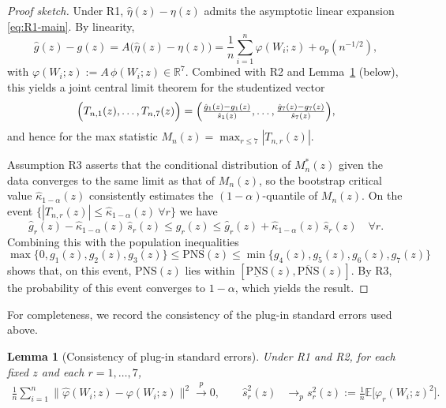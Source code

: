 \documentclass[accepted]{uai2026} %
\theoremstyle{plain}
\newtheorem{lemma}[theorem]{Lemma}
\theoremstyle{definition}
\theoremstyle{remark}
\begin{document}
\begin{proof}[Proof sketch]
Under R1, $\hat\eta(z) - \eta(z)$ admits the asymptotic linear expansion
\eqref{eq:R1-main}. By linearity,
\[
  \hat g(z) - g(z)
  = A\bigl(\hat\eta(z) - \eta(z)\bigr)
  = \frac{1}{n}\sum_{i=1}^n \varphi(W_i;z) + o_p(n^{-1/2}),
\]
with $\varphi(W_i;z) := A\,\phi(W_i;z) \in \mathbb{R}^7$. Combined with R2 and
Lemma~\ref{lem:SE-consistency} (below), this yields a joint central limit
theorem for the studentized vector
\[
  \Bigl(
    T_{n,1}(z),\dots,T_{n,7}(z)
  \Bigr)
  =
  \Bigl(
    \tfrac{\hat g_1(z)-g_1(z)}{\hat s_1(z)},\dots,
    \tfrac{\hat g_7(z)-g_7(z)}{\hat s_7(z)}
  \Bigr),
\]
and hence for the max statistic $M_n(z) = \max_{r\le 7} |T_{n,r}(z)|$.

Assumption R3 asserts that the conditional distribution of $M_n^*(z)$ given
the data converges to the same limit as that of $M_n(z)$, so the bootstrap
critical value $\hat \kappa_{1-\alpha}(z)$ consistently estimates the
$(1-\alpha)$-quantile of $M_n(z)$.
On the event $\{|T_{n,r}(z)| \le \hat \kappa_{1-\alpha}(z)\ \forall r\}$ we have
\begin{equation}
\label{eq:coverage-event}
  \hat g_r(z) - \hat \kappa_{1-\alpha}(z)\,\hat s_r(z)
  \le g_r(z)
  \le \hat g_r(z) + \hat \kappa_{1-\alpha}(z)\,\hat s_r(z)
  \quad \forall r.    
\end{equation}
Combining this with the population inequalities
\begin{equation}
\label{eq:tian-pearl-ineq}
  \max\{0,g_1(z),g_2(z),g_3(z)\}
  \le \mathrm{PNS}(z)
  \le \min\{g_4(z),g_5(z),g_6(z),g_7(z)\}  
\end{equation}
shows that, on this event,
$\mathrm{PNS}(z)$ lies within
$[\underline{\mathrm{PNS}}(z),\overline{\mathrm{PNS}}(z)]$. By R3, the
probability of this event converges to $1-\alpha$, which yields the result.
\end{proof}

For completeness, we record the consistency of the plug-in standard errors
used above.

\begin{lemma}[Consistency of plug-in standard errors]
\label{lem:SE-consistency}
Under R1 and R2, for each fixed $z$ and each $r=1,\dots,7$,
\begin{align*}
  \frac{1}{n}\sum_{i=1}^n
    \bigl\|\hat\varphi(W_i;z) - \varphi(W_i;z)\bigr\|^2
  \xrightarrow{p} 0, \quad \quad
  \hat s_r^2(z) &\to_p s_r^2(z)
  := \frac{1}{n}\mathbb{E}\bigl[\varphi_r(W_i;z)^2\bigr].
\end{align*}
\end{lemma}
\end{document}
